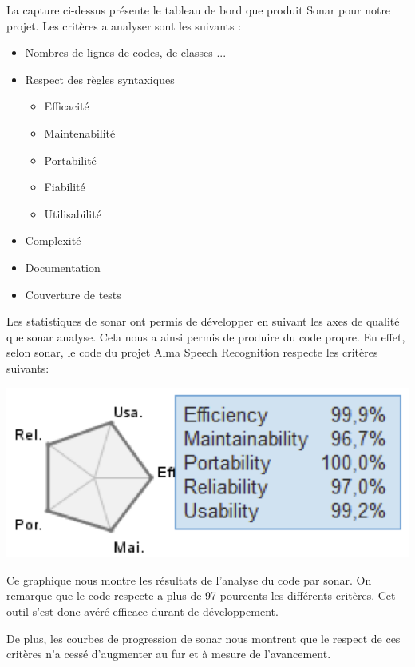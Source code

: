 La capture ci-dessus présente le tableau de bord que produit Sonar pour notre projet. Les critères a analyser sont les suivants :

\begin{itemize}
\item Nombres de lignes de codes, de classes ...
\item Respect des règles syntaxiques
	\begin{itemize}
	\item Efficacité
	\item Maintenabilité
	\item Portabilité
	\item Fiabilité
	\item Utilisabilité
	\end{itemize}
\item Complexité
\item Documentation
\item Couverture de tests
\end{itemize}


Les statistiques de sonar ont permis de développer en suivant les axes de qualité que sonar analyse. Cela nous a ainsi permis de produire du code propre. En effet, selon sonar, le code du projet Alma Speech Recognition respecte les critères suivants: 

\includegraphics{images/sonar-axes.png} 

Ce graphique nous montre les résultats de l'analyse du code par sonar. On remarque que le code respecte a plus de 97 pourcents les différents critères. Cet outil s'est donc avéré efficace durant de développement.

De plus, les courbes de progression de sonar nous montrent que le respect de ces critères n'a cessé d'augmenter au fur et à mesure de l'avancement.



